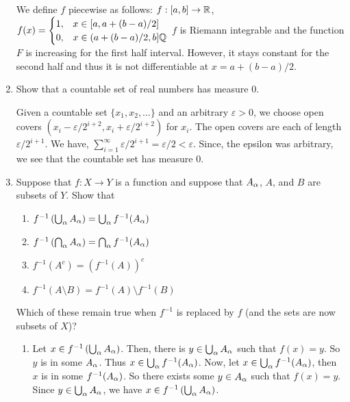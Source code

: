 \documentclass[12pt]{article}
\begin{document}
\begin{enumerate}
\begin{mybox}
    
  We define $f$ piecewise as follows:
  $f:[a,b]\to\mathbb{R}$, \ $f(x) = \begin{cases}
    1, & x \in [a, a+(b-a)/2]\\
    0, & x \in (a+(b-a)/2,b]\mathbb{Q}
  \end{cases}$
  $f$ is Riemann integrable and the function $F$ is increasing
  for the first half interval. However, it stays constant for
  the second half and thus it is not differentiable at
  $x=a+(b-a)/2$.
\end{mybox}
  
\item Show that a countable set of real numbers has
measure 0. 
\begin{mybox}
    
  Given a countable set $\{x_1,x_2,\ldots\}$
  and an arbitrary $\varepsilon>0$,
  we choose open covers $(x_i-\varepsilon/2^{i+2},
  x_i+\varepsilon/2^{i+2})$ for $x_i$. The open covers
  are each of length $\varepsilon/2^{i+1}$.
  We have, $\sum_{i=1}^\infty{\varepsilon/2^{i+1}}=\varepsilon/2
  <\varepsilon$. Since, the epsilon was arbitrary, we see that
  the countable set has measure 0.
\end{mybox}

\item Suppose that $f: X \to Y$ is a function and suppose
that $A_{\alpha}$, $A$, and $B$ are subsets of $Y$. Show that
\begin{enumerate}

\item $ f^{-1}\left(\bigcup_{\alpha} A_{\alpha}\right)
= \bigcup_{\alpha}
f^{-1}(A_{\alpha})$
\item $ f^{-1}\left(\bigcap_{\alpha} A_{\alpha}\right)
= \bigcap_{\alpha}
f^{-1}(A_{\alpha})$
\item $ f^{-1}(A^c) = (f^{-1}(A))^c$
\item $ f^{-1}(A \setminus B) = f^{-1}(A)
\setminus f^{-1}(B)$
\end{enumerate}

Which of these remain true when $f^{-1}$ is replaced by $f$
(and the sets are now subsets of $X$)?

\begin{mybox}

\begin{enumerate}
  \item Let $x\in f^{-1}\left(\bigcup_{\alpha} A_{\alpha}\right)$.
  Then, there is $y\in \bigcup_{\alpha} A_{\alpha}$ such that
  $f(x)=y$. So $y$ is in some $A_{\alpha}$. Thus $x\in
  \bigcup_{\alpha}f^{-1}(A_{\alpha})$. Now, let $x\in \bigcup_{\alpha}
  f^{-1}(A_{\alpha})$, then $x$ is in some $f^{-1}(A_{\alpha})$.
  So there exists some $y\in A_{\alpha}$ such that $f(x)=y$.
  Since $y\in \bigcup_{\alpha} A_{\alpha}$, we have
  $x\in f^{-1}\left(\bigcup_{\alpha} A_{\alpha}\right)$.


\end{enumerate}
\end{mybox}
\end{enumerate}
\end{document}
